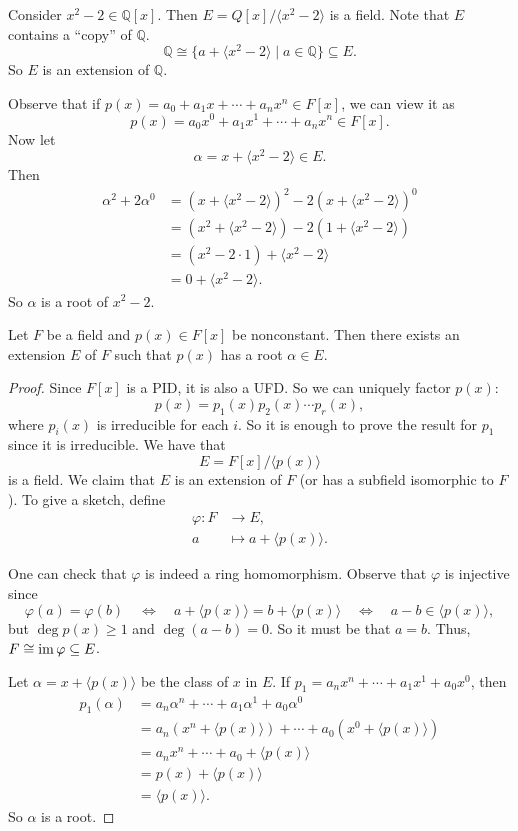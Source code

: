 \begin{example}
	Consider $x^2-2\in\mathbb Q[x]$. Then $E=Q[x]/\langle x^2-2\rangle$ is a field. Note that $E$ contains a ``copy'' of $\mathbb Q$.
	$$\mathbb Q\cong\{a+\langle x^2-2\rangle\mid a\in\mathbb Q\}\subseteq E.$$
	So $E$ is an extension of $\mathbb Q$.

	Observe that if $p(x)=a_0+a_1x+\cdots+a_nx^n\in F[x]$, we can view it as
	$$p(x)=a_0x^0+a_1x^1+\cdots+a_nx^n\in F[x].$$
	Now let
	$$\alpha=x+\langle x^2-2\rangle\in E.$$
	Then
	\begin{align*}
		\alpha^2+2\alpha^0&=(x+\langle x^2-2\rangle)^2-2(x+\langle x^2-2\rangle)^0\\
		&=(x^2+\langle x^2-2\rangle)-2(1+\langle x^2-2\rangle)\\
		&=(x^2-2\cdot 1)+\langle x^2-2\rangle\\
		&=0+\langle x^2-2\rangle.
	\end{align*}
	So $\alpha$ is a root of $x^2-2$.
\end{example}

\begin{theorem}
	Let $F$ be a field and $p(x)\in F[x]$ be nonconstant. Then there exists an extension $E$ of $F$ such that $p(x)$ has a root $\alpha\in E$.
\end{theorem}

\begin{proof}
	Since $F[x]$ is a PID, it is also a UFD. So we can uniquely factor $p(x)$:
	$$p(x)=p_1(x)p_2(x)\cdots p_r(x),$$
	where $p_i(x)$ is irreducible for each $i$. So it is enough to prove the result for $p_1$ since it is irreducible. We have that
	$$E=F[x]/\langle p(x)\rangle$$
	is a field. We claim that $E$ is an extension of $F$ (or has a subfield isomorphic to $F$). To give a sketch, define
	\begin{align*}
		\varphi\colon F&\to E,\\
		a&\mapsto a+\langle p(x)\rangle.
	\end{align*}

	One can check that $\varphi$ is indeed a ring homomorphism. Observe that $\varphi$ is injective since
	$$\varphi(a)=\varphi(b)\quad\Leftrightarrow\quad a+\langle p(x)\rangle=b+\langle p(x)\rangle\quad\Leftrightarrow\quad a-b\in\langle p(x)\rangle,$$
	but $\deg p(x)\geq 1$ and $\deg (a-b)=0$. So it must be that $a=b$. Thus, $F\cong\operatorname{im}\varphi\subseteq E$.

	Let $\alpha=x+\langle p(x)\rangle$ be the class of $x$ in $E$. If $p_1=a_nx^n+\cdots+a_1x^1+a_0x^0$, then
	\begin{align*}
		p_1(\alpha)&=a_n\alpha^n+\cdots+a_1\alpha^1+a_0\alpha^0\\
		&=a_n(x^n+\langle p(x)\rangle)+\cdots+a_0(x^0+\langle p(x)\rangle)\\
		&=a_nx^n+\cdots +a_0+\langle p(x)\rangle\\
		&=p(x)+\langle p(x)\rangle\\
		&=\langle p(x)\rangle.
	\end{align*}
	So $\alpha$ is a root.
\end{proof}

